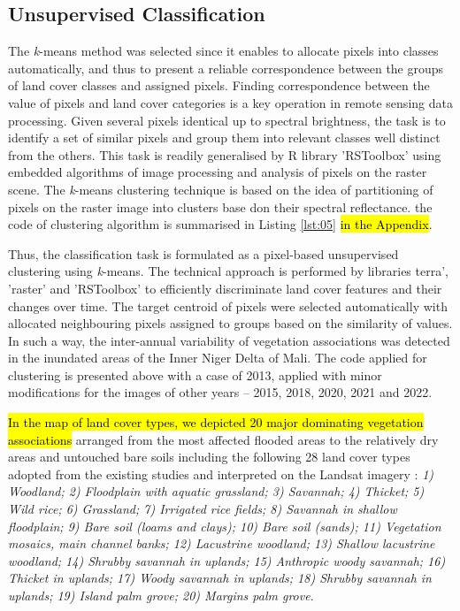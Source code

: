 \documentclass[12pt,a4paper,oneside]{article}
\def \newpar{\vspace{6pt}}
\begin{document}
\subsection*{Unsupervised Classification}

\newpar The \emph{k}-means method was selected since it enables to allocate pixels into classes automatically, and thus to present a reliable correspondence between the groups of land cover classes and assigned pixels. Finding correspondence between the value of pixels and land cover categories is a key operation in remote sensing data processing. Given several pixels identical up to spectral brightness, the task is to identify a set of similar pixels and group them into relevant classes well distinct from the others. This task is readily generalised by R library 'RSToolbox' using embedded algorithms of image processing and analysis of pixels on the raster scene. The \emph{k}-means clustering technique is based on the idea of partitioning of pixels on the raster image into clusters base don their spectral reflectance. the code of clustering algorithm is summarised in Listing \ref{lst:05} \hl{in the Appendix}.

\newpar Thus, the classification task is formulated as a pixel-based unsupervised clustering using \emph{k}-means. The technical approach is performed by libraries terra', 'raster' and 'RSToolbox' to efficiently discriminate land cover features and their changes over time. The target centroid of pixels were selected automatically with allocated neighbouring pixels assigned to groups based on the similarity of values. In such a way, the inter-annual variability of vegetation associations was detected in the inundated areas of the Inner Niger Delta of Mali. The code applied for clustering is presented above with a case of 2013, applied with minor modifications for the images of other years -- 2015, 2018, 2020, 2021 and 2022.

\newpar \hl{In the map of land cover types, we depicted 20 major dominating vegetation associations} arranged from the most affected flooded areas to the relatively dry areas and untouched bare soils including the following 28 land cover types adopted from the existing studies and interpreted on the Landsat imagery \cite{Marie}: \emph{1) Woodland; 2) Floodplain with aquatic grassland; 3) Savannah; 4) Thicket; 5) Wild rice; 6) Grassland; 7) Irrigated rice fields; 8) Savannah in shallow floodplain; 9) Bare soil (loams and clays); 10) Bare soil (sands); 11) Vegetation mosaics, main channel banks; 12) Lacustrine woodland; 13) Shallow lacustrine woodland; 14) Shrubby savannah in uplands; 15) Anthropic woody savannah; 16) Thicket in uplands; 17) Woody savannah in uplands; 18) Shrubby savannah in uplands; 19) Island palm grove; 20) Margins palm grove}.
\end{document}
